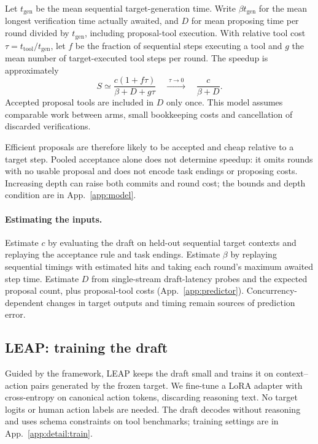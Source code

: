 Let $t_{\mathrm{gen}}$ be the mean sequential target-generation time. Write $\beta t_{\mathrm{gen}}$
for the mean longest verification time actually awaited, and $D$ for mean proposing time per round
divided by $t_{\mathrm{gen}}$, including proposal-tool execution. With relative tool cost
$\tau=t_{\mathrm{tool}}/t_{\mathrm{gen}}$, let $f$ be the fraction of sequential steps executing a tool
and $g$ the mean number of target-executed tool steps per round. The speedup is approximately
\begin{equation}
 S\simeq\frac{c(1+f\tau)}{\beta+D+g\tau}
 \quad\xrightarrow{\;\tau\to0\;}\quad\frac{c}{\beta+D}.
 \label{eq:main:S}
\end{equation}
Accepted proposal tools are included in $D$ only once. This model assumes comparable work between
arms, small bookkeeping costs and cancellation of discarded verifications.

Efficient proposals are therefore likely to be accepted and cheap relative to a target step.
Pooled acceptance alone does not determine speedup: it omits rounds with no usable proposal and
does not encode task endings or proposing costs. Increasing depth can raise both commits
and round cost; the bounds and depth condition are in App.~\ref{app:model}.

\paragraph{Estimating the inputs.}
Estimate $c$ by evaluating the draft on held-out sequential target contexts and replaying the acceptance
rule and task endings. Estimate $\beta$ by replaying sequential timings with estimated hits and taking
each round's maximum awaited step time. Estimate $D$ from single-stream draft-latency
probes and the expected proposal count, plus proposal-tool costs (App.~\ref{app:predictor}).
Concurrency-dependent changes in target outputs and timing remain sources of prediction error.

\subsection{LEAP: training the draft}
\label{sec:train}
Guided by the framework, LEAP keeps the draft small and trains it on context--action pairs generated
by the frozen target. We fine-tune a LoRA adapter with cross-entropy on canonical action tokens,
discarding reasoning text. No target logits or human action labels are needed. The draft decodes
without reasoning and uses schema constraints on tool benchmarks; training settings are in
App.~\ref{app:detail:train}.

